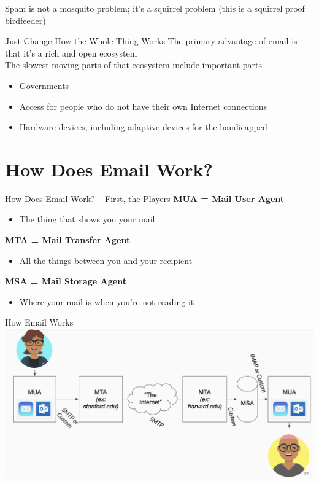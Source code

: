 \documentclass[nobackground,dvipsnames,table]{beamer}
\begin{document}
\begin{frame}{Spam is not a mosquito problem; it’s a squirrel problem}
    (this is a squirrel proof birdfeeder)
\end{frame}

\begin{frame}{Just Change How the Whole Thing Works}
    The primary advantage of email is that it’s a rich and open ecosystem\\
    The slowest moving parts of that ecosystem include important parts
    \begin{itemize}
        \item Governments
        \item Access for people who do not have their own Internet connections
        \item Hardware devices, including adaptive devices for the handicapped
    \end{itemize}
\end{frame}

\section{How Does Email Work?}

\begin{frame}{How Does Email Work? – First, the Players}
    \textbf{MUA = Mail User Agent}
    \begin{itemize}
        \item The thing that shows you your mail
    \end{itemize}
    
    \textbf{MTA = Mail Transfer Agent}
    \begin{itemize}
        \item All the things between you and your recipient
    \end{itemize}
    
    \textbf{MSA = Mail Storage Agent}
    \begin{itemize}
        \item Where your mail is when you're not reading it
    \end{itemize}
\end{frame}

\begin{frame}{How Email Works}
    \includegraphics[width=\textwidth]{how-email-works}
\end{frame}
\end{document}
